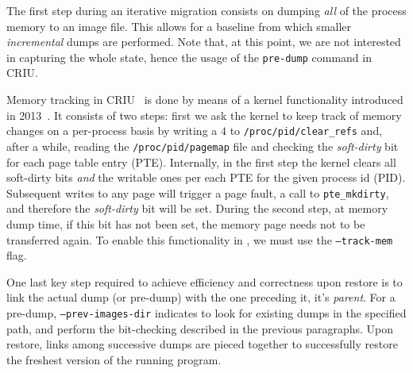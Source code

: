 The first step during an iterative migration consists on dumping \emph{all} of the process memory to an image file.
This allows for a baseline from which smaller \emph{incremental} dumps are performed.
Note that, at this point, we are not interested in capturing the whole state, hence the usage of the \texttt{pre-dump} command in CRIU.

Memory tracking in CRIU~\cite{criu-memory-tracking} is done by means of a kernel functionality introduced in 2013~\cite{criu-memory-tracking-lwn}.
It consists of two steps: first we ask the kernel to keep track of memory changes on a per-process basis by writing a $4$ to \texttt{/proc/pid/clear\_refs} and, after a while, reading the \texttt{/proc/pid/pagemap} file and checking the \textit{soft-dirty} bit for each page table entry (PTE).
Internally, in the first step the kernel clears all soft-dirty bits \emph{and} the writable ones per each PTE for the given process id (PID).
Subsequent writes to any page will trigger a page fault, a call to \texttt{pte\_mkdirty}, and therefore the \textit{soft-dirty} bit will be set.
During the second step, at memory dump time, if this bit has not been set, the memory page needs not to be transferred again.
To enable this functionality in \criu, we must use the \texttt{--track-mem} flag.

One last key step required to achieve efficiency and correctness upon restore is to link the actual dump (or pre-dump) with the one preceding it, it's \emph{parent}.
For a pre-dump, \texttt{--prev-images-dir} indicates \criu to look for existing dumps in the specified path, and perform the bit-checking described in the previous paragraphs.
Upon restore, links among successive dumps are pieced together to successfully restore the freshest version of the running program.

